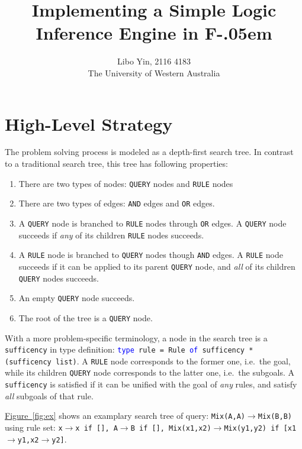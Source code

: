 \documentclass[11pt,a4paper]{article}
\newcommand{\FSharp}{{\settoheight{\dimen0}{F}F\kern-.05em \resizebox{!}{\dimen0}{\raisebox{\depth}{\#}}}}
\begin{document}
\title{Implementing a Simple Logic Inference Engine in \FSharp}
\author{Libo Yin, 2116 4183\\The University of Western Australia}
\maketitle

\section{High-Level Strategy}

The problem solving process is modeled as a depth-first search tree. In contrast to a traditional search tree, this tree has following properties:

\begin{enumerate}[itemsep=0mm]
\item There are two types of nodes: \texttt{QUERY} nodes and \texttt{RULE} nodes
\item There are two types of edges: \texttt{AND} edges and \texttt{OR} edges.
\item A \texttt{QUERY} node is branched to \texttt{RULE} nodes through \texttt{OR} edges. A \texttt{QUERY} node succeeds if \emph{any} of its children \texttt{RULE} nodes succeeds.
\item A \texttt{RULE} node is branched to \texttt{QUERY} nodes though \texttt{AND} edges. A \texttt{RULE} node succeeds if it can be applied to its parent \texttt{QUERY} node, and \emph{all} of its children \texttt{QUERY} nodes succeeds.
\item An empty \texttt{QUERY} node succeeds.
\item The root of the tree is a \texttt{QUERY} node.
\end{enumerate}

With a more problem-specific terminology, a node in the search tree is a \texttt{sufficency} in type definition: \texttt{\textcolor{blue}{type} rule = Rule \textcolor{blue}{of} sufficency * (sufficency list)}. A \texttt{RULE} node corresponds to the former one, i.e.\ the goal, while its children \texttt{QUERY} node corresponds to the latter one, i.e.\ the subgoals. A \texttt{sufficency} is satisfied if it can be unified with the goal of \emph{any} rules, and satisfy \emph{all} subgoals of that rule.

\hyperref[fig:ex1]{Figure~\ref{fig:ex}} shows an examplary search tree of query: \texttt{Mix(A,A)$\rightarrow$Mix(B,B)} using rule set: \texttt{x$\rightarrow$x if [], A$\rightarrow$B if [], Mix(x1,x2)$\rightarrow$Mix(y1,y2) if [x1$\rightarrow$y1,x2$\rightarrow$y2]}.
\end{document}
